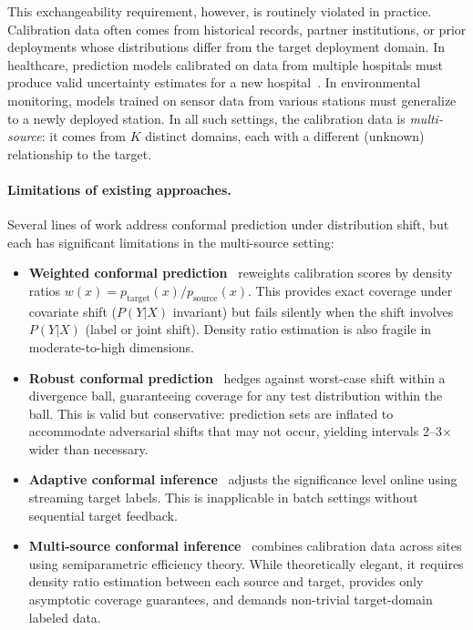 \documentclass{article}
\begin{document}
This exchangeability requirement, however, is routinely violated in practice. Calibration data often comes from historical records, partner institutions, or prior deployments whose distributions differ from the target deployment domain. In healthcare, prediction models calibrated on data from multiple hospitals must produce valid uncertainty estimates for a new hospital~\citep{liu2024multi}. In environmental monitoring, models trained on sensor data from various stations must generalize to a newly deployed station. In all such settings, the calibration data is \emph{multi-source}: it comes from $K$ distinct domains, each with a different (unknown) relationship to the target.

\paragraph{Limitations of existing approaches.}
Several lines of work address conformal prediction under distribution shift, but each has significant limitations in the multi-source setting:
\begin{itemize}
\item \textbf{Weighted conformal prediction}~\citep{tibshirani2019conformal} reweights calibration scores by density ratios $w(x) = p_{\text{target}}(x)/p_{\text{source}}(x)$. This provides exact coverage under covariate shift ($P(Y|X)$ invariant) but fails silently when the shift involves $P(Y|X)$ (label or joint shift). Density ratio estimation is also fragile in moderate-to-high dimensions.
\item \textbf{Robust conformal prediction}~\citep{cauchois2024robust} hedges against worst-case shift within a divergence ball, guaranteeing coverage for any test distribution within the ball. This is valid but conservative: prediction sets are inflated to accommodate adversarial shifts that may not occur, yielding intervals 2--3$\times$ wider than necessary.
\item \textbf{Adaptive conformal inference}~\citep{gibbs2021adaptive} adjusts the significance level online using streaming target labels. This is inapplicable in batch settings without sequential target feedback.
\item \textbf{Multi-source conformal inference}~\citep{liu2024multi} combines calibration data across sites using semiparametric efficiency theory. While theoretically elegant, it requires density ratio estimation between each source and target, provides only asymptotic coverage guarantees, and demands non-trivial target-domain labeled data.
\end{itemize}
\end{document}

